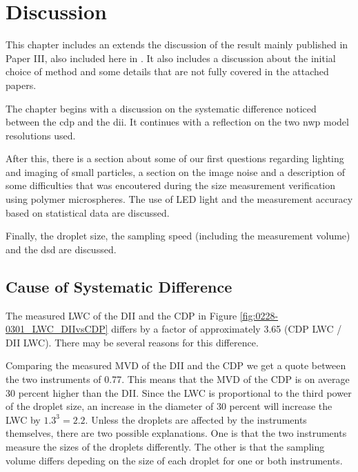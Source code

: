 
\chapter{Discussion}
\label{chap:discussion}

This chapter includes an extends the discussion of the result mainly published in Paper III, also included here in . It also includes a discussion about the initial choice of method and some details that are not fully covered in the attached papers. 

The chapter begins with a discussion on the systematic difference noticed between the \gls{cdp} and the \gls{dii}. It continues with a reflection on the two \gls{nwp} model resolutions used. 

After this, there is a section about some of our first questions regarding lighting and imaging of small particles, a section on the image noise and a description of some difficulties that was encoutered during the size measurement verification using polymer microspheres. The use of LED light and the measurement accuracy based on statistical data are discussed. 

Finally, the droplet size, the sampling speed (including the measurement volume) and the \gls{dsd} are discussed.


\section{Cause of Systematic Difference}
\label{sec:systemdiff}

The measured LWC of the DII and the CDP in Figure \ref{fig:0228-0301_LWC_DIIvsCDP} differs by a factor of approximately 3.65 (CDP LWC / DII LWC). There may be several reasons for this difference.

Comparing the measured MVD of the DII and the CDP we get a quote between the two instruments of 0.77. This means that the MVD of the CDP is on average 30 percent higher than the DII. Since the LWC is proportional to the third power of the droplet size, an increase in the diameter of 30 percent will increase the LWC by $1.3^3=2.2$. Unless the droplets are affected by the instruments themselves, there are two possible explanations. One is that the two instruments measure the sizes of the droplets differently. The other is that the sampling volume differs depeding on the size of each droplet for one or both instruments.

